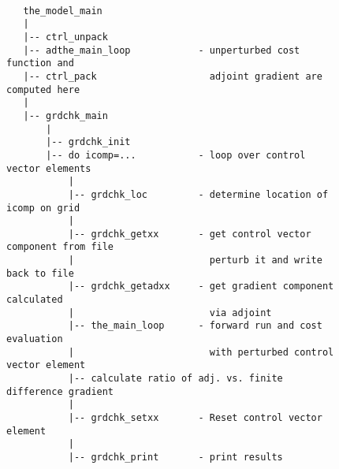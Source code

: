 \begin{figure}[h!]

{\scriptsize
\begin{verbatim}

   the_model_main
   |
   |-- ctrl_unpack
   |-- adthe_main_loop            - unperturbed cost function and
   |-- ctrl_pack                    adjoint gradient are computed here
   |
   |-- grdchk_main
       |
       |-- grdchk_init
       |-- do icomp=...           - loop over control vector elements
           |
           |-- grdchk_loc         - determine location of icomp on grid
           |
           |-- grdchk_getxx       - get control vector component from file
           |                        perturb it and write back to file
           |-- grdchk_getadxx     - get gradient component calculated 
           |                        via adjoint
           |-- the_main_loop      - forward run and cost evaluation
           |                        with perturbed control vector element
           |-- calculate ratio of adj. vs. finite difference gradient
           |
           |-- grdchk_setxx       - Reset control vector element
           |
           |-- grdchk_print       - print results

\end{verbatim}
}

\caption{~}
\label{fig:grdchkflow}
\end{figure}
